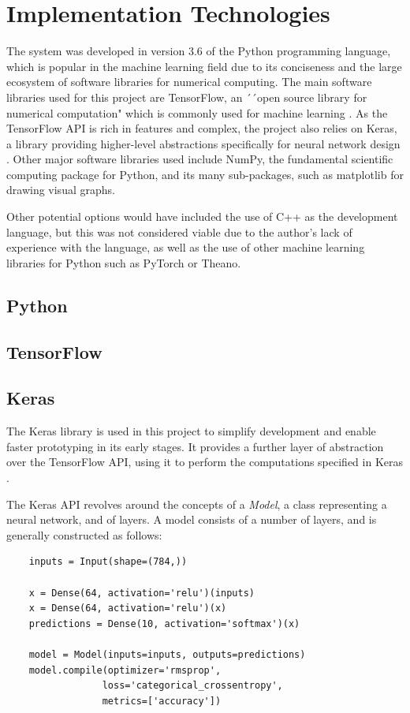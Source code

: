 \documentclass[12pt, titlepage]{report}
\theoremstyle{definition}
\begin{document}
\section{Implementation Technologies}
The system was developed in version 3.6 of the Python programming language, which is popular in the machine learning field due to its conciseness and the large ecosystem of software libraries for numerical computing. The main software libraries used for this project are TensorFlow, an ´´open source library for numerical computation" which is commonly used for machine learning \cite{tensorflow}. As the TensorFlow API is rich in features and complex, the project also relies on Keras, a library providing higher-level abstractions specifically for neural network design \cite{keras}. Other major software libraries used include NumPy, the fundamental scientific computing package for Python, and its many sub-packages, such as matplotlib for drawing visual graphs\cite{numpy}.

Other potential options would have included the use of C++ as the development language, but this was not considered viable due to the author's lack of experience with the language, as well as the use of other machine learning libraries for Python such as PyTorch or Theano.

\subsection{Python}
\subsection{TensorFlow}
\subsection{Keras}
The Keras library is used in this project to simplify development and enable faster prototyping in its early stages. It provides a further layer of abstraction over the TensorFlow API, using it to perform the computations specified in Keras \cite{keras}.

The Keras API revolves around the concepts of a \textit{Model}, a class representing a neural network, and of layers. A model consists of a number of layers, and is generally constructed as follows:

\begin{verbatim}
	inputs = Input(shape=(784,))

	x = Dense(64, activation='relu')(inputs)
	x = Dense(64, activation='relu')(x)
	predictions = Dense(10, activation='softmax')(x)

	model = Model(inputs=inputs, outputs=predictions)
	model.compile(optimizer='rmsprop',
             	 loss='categorical_crossentropy',
              	 metrics=['accuracy'])
\end{verbatim}
\end{document}
